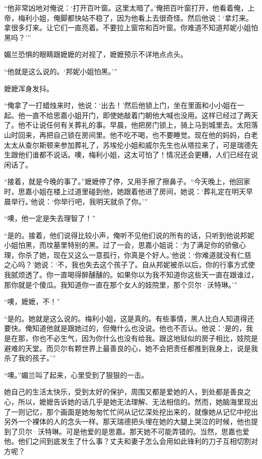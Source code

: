 \par “他非常凶地对俺说：‘打开百叶窗。这里太暗了。’俺把百叶窗打开，他看着俺，上帝，梅利小姐，俺脚都快站不稳了，因为他看上去很奇怪。然后他说：‘拿灯来。拿很多灯来。让它们一直亮着。不要拉上窗帘和百叶窗。你难道不知道邦妮小姐怕黑吗？'”
\par 媚兰恐惧的眼睛跟嬷嬷的对视了，嬷嬷预示不详地点点头。
\par “他就是这么说的。‘邦妮小姐怕黑。'”
\par 嬷嬷浑身发抖。
\par “俺拿了一打蜡烛来时，他说：‘出去！’然后他锁上门，坐在里面和小小姐在一起。他一直不给思嘉小姐开门，即使她敲着门朝他大喊也没用。这样已经过了两天了。他不让说任何有关葬礼的事。早晨，他把房门锁上，骑上马到城里去。太阳落山时回来，再把自己锁在房间里。他不吃不喝，也不要睡觉。现在他的妈妈，白老太太从查尔斯顿来参加葬礼了，苏埃伦小姐和威尔先生也从塔拉来了，可是瑞德先生跟他们谁都不说话。噢，梅利小姐，这太可怕了！情况还会更糟，人们已经在说闲话了。
\par “接着，就是今晚的事了。”嬷嬷停了停，又用手擦了擦鼻子。“今天晚上，他回家时，思嘉小姐在楼上过道里碰到他，她跟着他进了房间，她说：‘葬礼定在明天早晨举行。’他说：‘你举行吧，我明天就杀了你。'”
\par “噢，他一定是失去理智了！”
\par “是的。接着，他们说得比较小声，俺听不见他们说的所有的话，只听到他说邦妮小姐怕黑，而坟墓里特别的黑。过了一会，思嘉小姐说：‘为了满足你的骄傲心理，你杀了她，现在又这么一意孤行，你真是个好人。’他说：‘你难道就没有仁慈之心吗？’她说：‘不，我也失去这个孩子了。自从邦妮被杀以后，你的行事方式使我腻烦透了。你一直喝得醉醺醺的。如果你以为我不知道你这些天一直在跟谁过，那你就是个傻瓜。我知道你一直在那个女人的妓院里，那个贝尔·沃特琳。'”
\par “噢，嬷嬷，不！”
\par “是的。她就是这么说的。梅利小姐，这是真的。有些事情，黑人比白人知道得还要快。俺知道他就是跟她过的，但俺什么也没说。他也不否认。他说：‘是的，我是在那，你也不必生气，因为你什么也没有给我。跟这地狱似的房子相比，妓院是避难的天堂。而贝尔有颗世界上最善良的心，她不会把责任都推到我身上，说是我杀了我的孩子。'”
\par “噢。”媚兰叫了起来，心里受到了狠狠的一击。
\par 她自己的生活太快乐，受到太好的保护，周围又都是爱她的人，到处都是善良之心，所以，嬷嬷告诉她的话几乎是她无法理解、无法相信的。然而，她脑海里现出了一则记忆，那个画面是她匆匆忙忙间从记忆深处挖出来的，就像她从记忆中挖出另外一个裸体的人的念头一样。那天瑞德把头埋在她的大腿上哭泣的时候，他也提到了贝尔·沃特琳。可是他爱的是思嘉。那天她不可能弄错的。当然，思嘉也爱他。他们之间到底发生了什么事？丈夫和妻子怎么会用如此锋利的刀子互相切割对方呢？
